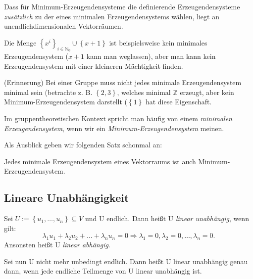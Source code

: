 \documentclass[10pt]{scrbook}
\begin{document}
\begin{Bem}
Dass für Minimum-Erzeugendensysteme die definierende Erzeugendensysteme \emph{zusätzlich} zu der eines minimalen Erzeugendensystems wählen, liegt an unendlichdimensionalen Vektorräumen.

Die Menge $\left\{x^i\right\}_{i\in\mathbb{N}_0}\cup \left\{x+1\right\}$ ist beispielsweise kein minimales Erzeugendensystem ($x+1$ kann man weglassen), aber man kann kein Erzeugendensystem mit einer kleineren Mächtigkeit finden.
\label{bem:unendlich_dimensionale_vr}
\end{Bem}

\begin{Bem}
(Erinnerung) Bei einer Gruppe muss nicht jedes minimale Erzeugendensystem minimal sein (betrachte z. B. $\left\{ 2, 3\right\}$, welches minimal $\mathbb{Z}$ erzeugt, aber kein Minimum-Erzeugendensystem darstellt ($\left\{ 1\right\}$ hat diese Eigenschaft.
\end{Bem}

\begin{Bem}
Im gruppentheoretischen Kontext spricht man häufig von einem \emph{minimalen Erzeugendensystem}, wenn wir ein \emph{Minimum-Erzeugendensystem} meinen.
\end{Bem}

Als Ausblick geben wir folgenden Satz schonmal an:
\begin{Sa}
Jedes minimale Erzeugendensystem eines Vektorraums ist auch Minimum-Erzeugendensystem.
\end{Sa}

\subsection{Lineare Unabhängigkeit}

\begin{Def}
Sei $U:=\left\{u_1, \ldots, u_n\right\}\subseteq V$ und U endlich. Dann heißt U \emph{linear unabhängig}, wenn gilt:
\begin{displaymath}
	\lambda_1 u_1+\lambda_2 u_2+\ldots+\lambda_n u_n =0 \Rightarrow \lambda_1=0, \lambda_2=0, \ldots, \lambda_n=0.
\end{displaymath}
Ansonsten heißt U \emph{linear abhängig}.
\end{Def}

\begin{Def}
Sei nun U nicht mehr unbedingt endlich. Dann heißt U linear unabhängig genau dann, wenn jede endliche Teilmenge von U linear unabhängig ist.
\end{Def}
\end{document}
